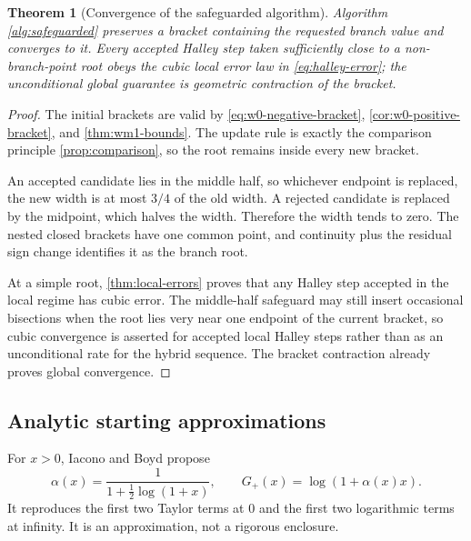 \documentclass[11pt]{article}
\numberwithin{equation}{section}
\newtheorem{theorem}{Theorem}[section]
\theoremstyle{definition}
\theoremstyle{remark}
\begin{document}
\begin{theorem}[Convergence of the safeguarded algorithm]
\label{thm:safeguarded-convergence}
Algorithm \ref{alg:safeguarded} preserves a bracket containing the requested
branch value and converges to it.  Every accepted Halley step taken
sufficiently close to a non-branch-point root obeys the cubic local error law
in \eqref{eq:halley-error}; the unconditional global guarantee is geometric
contraction of the bracket.
\end{theorem}

\begin{proof}
The initial brackets are valid by \eqref{eq:w0-negative-bracket},
\cref{cor:w0-positive-bracket}, and \cref{thm:wm1-bounds}.  The update rule is
exactly the comparison principle \cref{prop:comparison}, so the root remains
inside every new bracket.

An accepted candidate lies in the middle half, so whichever endpoint is
replaced, the new width is at most $3/4$ of the old width.  A rejected
candidate is replaced by the midpoint, which halves the width.  Therefore the
width tends to zero.  The nested closed brackets have one common point, and
continuity plus the residual sign change identifies it as the branch root.

At a simple root, \cref{thm:local-errors} proves that any Halley step accepted
in the local regime has cubic error.  The middle-half safeguard may still
insert occasional bisections when the root lies very near one endpoint of the
current bracket, so cubic convergence is asserted for accepted local Halley
steps rather than as an unconditional rate for the hybrid sequence.  The
bracket contraction already proves global convergence.
\end{proof}

\subsection{Analytic starting approximations}

For $x>0$, Iacono and Boyd propose
\begin{equation}
 \alpha(x)=\frac1{1+\frac12\log(1+x)},
 \qquad
 G_+(x)=\log(1+\alpha(x)x).                            \label{eq:iacono-positive}
\end{equation}
It reproduces the first two Taylor terms at $0$ and the first two logarithmic
terms at infinity.  It is an approximation, not a rigorous enclosure.
\end{document}
